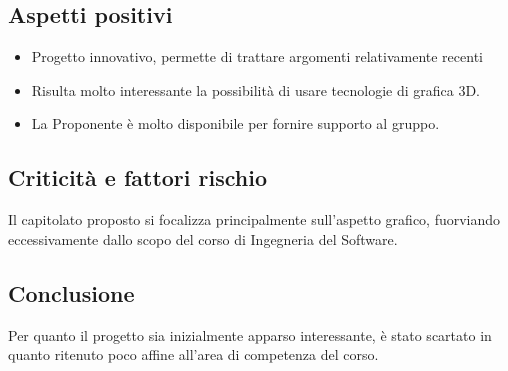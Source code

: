 \subsection{Aspetti positivi}
\begin{itemize}
    \item Progetto innovativo, permette di trattare argomenti relativamente recenti
    \item Risulta molto interessante la possibilità di usare tecnologie di grafica 3D.
    \item La Proponente è molto disponibile per fornire supporto al gruppo.
\end{itemize}


\subsection{Criticità e fattori rischio}
Il capitolato proposto si focalizza principalmente sull'aspetto grafico, fuorviando eccessivamente dallo scopo del corso di Ingegneria del Software.

\subsection{Conclusione}
Per quanto il progetto sia inizialmente apparso interessante, è stato scartato in quanto ritenuto poco
affine all'area di competenza del corso.
